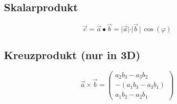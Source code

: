 		
		
		
		
	\subsection{Skalarprodukt}
	$$\vec{c} = \vec{a} \bullet \vec{b} = \vert \vec{a} \vert \cdot \vert \vec{b} \, \vert  \, \cos(\varphi)$$ 
		
		
		
		
		
	\subsection{Kreuzprodukt (nur in 3D)}
	 $$\vec{a} \times \vec{b} = \begin{pmatrix} a_2 b_3 - a_3 b_2 \\ -(a_1 b_3 - a_3 b_1) \\ a_1 b_2 - a_2 b_1 \end{pmatrix}$$ 
		
				
